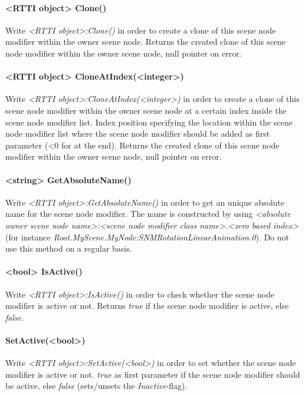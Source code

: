 \paragraph{<RTTI object> Clone()}
Write \emph{<RTTI object>:Clone()} in order to create a clone of this scene node modifier within the owner scene node. Returns the created clone of this scene node modifier within the owner scene node, null pointer on error.

\paragraph{<RTTI object> CloneAtIndex(<integer>)}
Write \emph{<RTTI object>:CloneAtIndex(<integer>)} in order to create a clone of this scene node modifier within the owner scene node at a certain index inside the scene node modifier list. Index position specifying the location within the scene node modifier list where the scene node modifier should be added as first parameter (<0 for at the end). Returns the created clone of this scene node modifier within the owner scene node, null pointer on error.

\paragraph{<string> GetAbsoluteName()}
Write \emph{<RTTI object>:GetAbsoluteName()} in order to get an unique absolute name for the scene node modifier. The name is constructed by using \emph{<absolute owner scene node name>:<scene node modifier class name>.<zero based index>} (for instance \emph{Root.MyScene.MyNode:SNMRotationLinearAnimation.0}). Do not use this method on a regular basis.

\paragraph{<bool> IsActive()}
Write \emph{<RTTI object>:IsActive()} in order to check whether the scene node modifier is active or not. Returns \emph{true} if the scene node modifier is active, else \emph{false}.

\paragraph{SetActive(<bool>)}
Write \emph{<RTTI object>:SetActive(<bool>)} in order to set whether the scene node modifier is active or not. \emph{true} as first parameter if the scene node modifier should be active, else \emph{false} (sets/unsets the \emph{Inactive}-flag).

